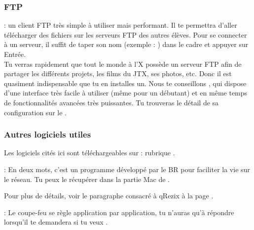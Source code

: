 \subsubsection{FTP}

  : un client FTP très simple à utiliser mais performant. Il te permettra d'aller télécharger des fichiers sur les serveurs FTP des autres élèves.
Pour se connecter à un serveur, il suffit de taper son nom (exemple : ) dans le cadre  et appuyer sur Entrée.\\
Tu verras rapidement que tout le monde à l'X possède un serveur FTP afin de partager les différents projets, les films du JTX, ses photos, etc. Donc il est quasiment indispensable que tu en installes un. Nous te conseillons , qui dispose d'une interface très facile à utiliser (même pour un débutant) et en même temps de fonctionnalités avancées très puissantes. Tu trouveras le détail de sa configuration sur le .

\subsubsection{Autres logiciels utiles}

Les logiciels cités ici sont téléchargeables sur  : rubrique .

 \noindent{} : En deux mots, c'est un programme développé par le BR pour faciliter la vie sur le réseau. Tu peux le récupérer dans la partie Mac de \xshare.

\noindent Pour plus de détails, voir le paragraphe consacré à qRezix à la page \pageref{qrezix}.

\noindent {} : Le coupe-feu se règle application par application, tu n'auras qu'à répondre  lorsqu'il te demandera si tu veux .


